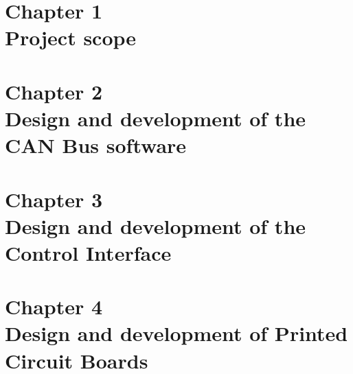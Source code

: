 \documentclass[a4paper,12pt,oneside]{report}
\begin{document}





\tableofcontents
\listoffigures
\listoftables




\pagestyle{fancy}

\newpage
{}



\part*{Chapter 1 \\Project scope}

\part*{Chapter 2 \\Design and development of the CAN Bus software}

\part*{Chapter 3 \\Design and development of the Control Interface}

\part*{Chapter 4 \\Design and development of Printed Circuit Boards}

% 

\fancyhead[R]{}





\newpage

\end{document}
